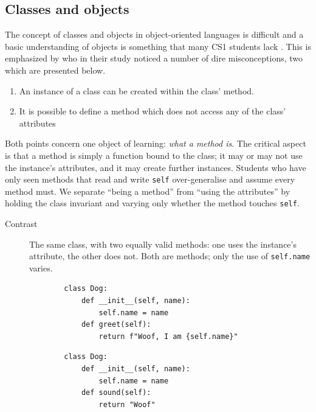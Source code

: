 \mode*
\subsection{Classes and objects}

The concept of classes and objects in object-oriented languages is difficult 
and a basic understanding of objects is something that many CS1 students lack 
\autocite{Kaczmarczyk2010}. This is emphasized by \textcite{Ragonis2005OOP} 
who in their study noticed a number of dire misconceptions, two which are 
presented below. 

\begin{enumerate}
    \item An instance of a class can be created within the class' method.

    \item It is possible to define a method which does not access any of the 
class' attributes
\end{enumerate}

Both points concern one object of learning: \emph{what a method is}. The
critical aspect is that a method is simply a function bound to the class; it may
or may not use the instance's attributes, and it may create further instances.
Students who have only seen methods that read and write \texttt{self}
over-generalise and assume every method must. We separate \enquote{being a
method} from \enquote{using the attributes} by holding the class invariant and
varying only whether the method touches \texttt{self}.

\begin{description}
  \item[Contrast] The same class, with two equally valid methods: one uses the
    instance's attribute, the other does not. Both are methods; only the use of
    \texttt{self.name} varies.

    \hfill
    \begin{minipage}[t]{0.45\columnwidth}
      \begin{verbatim}
        class Dog:
            def __init__(self, name):
                self.name = name
            def greet(self):
                return f"Woof, I am {self.name}"
      \end{verbatim}
    \end{minipage}
    \hfill
    \begin{minipage}[t]{0.45\columnwidth}
      \begin{verbatim}
        class Dog:
            def __init__(self, name):
                self.name = name
            def sound(self):
                return "Woof"
      \end{verbatim}
    \end{minipage}
\end{description}


